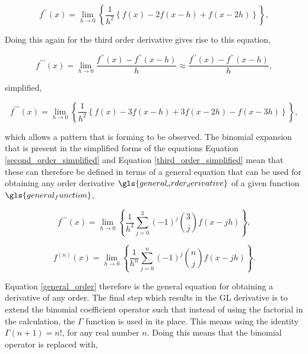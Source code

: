 \begin{equation}\label{second_order_simplified}
	f^{\prime\prime}(x) = \lim_{h \to 0} \left\{\frac{1}{h^{2}}\left\{f(x)-2f(x-h)+f(x-2h)\right\}\right\},
\end{equation}

Doing this again for the third order derivative gives rise to this equation,

\begin{equation}\label{third_order}
	f^{\prime\prime\prime}(x)= \lim_{h \to 0} \frac{f^{\prime\prime}(x)-f^{\prime\prime}(x-h)}{h} \approx \frac{f^{\prime\prime}(x)-f^{\prime\prime}(x-h)}{h},
\end{equation}

simplified, 

\begin{equation}\label{third_order_simplified}
	f^{\prime\prime\prime}(x) = \lim_{h \to 0} \left\{\frac{1}{h^{2}}\left\{f(x)-3f(x-h)+3f(x-2h)-f(x-3h)\right\}\right\},
\end{equation}

which allows a pattern that is forming to be observed. The binomial expansion that is present in the simplified forms of the equations Equation \ref{second_order_simplified} and Equation \ref{third_order_simplified} mean that these can therefore be defined in terms of a general equation that can be used for obtaining any order derivative $\gls{general_order_derivative}$ of a given function $\gls{general_function}$,

\begin{equation}\label{third_order_generified}
	f^{\prime\prime\prime}(x) = \lim_{h \to 0} \left\{\frac{1}{h^{3}}\sum_{j=0}^{3} (-1)^{j} {3 \choose j} f(x-jh)\right\},
\end{equation}

\begin{equation}\label{general_order}
	f^{(n)}(x) = \lim_{h \to 0} \left\{\frac{1}{h^{n}}\sum_{j=0}^{n} (-1)^{j} {n \choose j} f(x-jh)\right\}.
\end{equation}

Equation \ref{general_order} therefore is the general equation for obtaining a derivative of any order. The final step which results in the GL derivative is to extend the binomial coefficient operator such that instead of using the factorial in the calculation, the $\Gamma$ function is used in its place. This means using the identity $\Gamma(n+1) = n!$, for any real number $n$. Doing this means that the binomial operator is replaced with,

